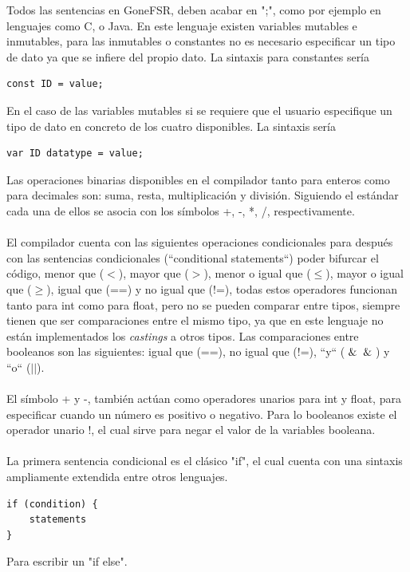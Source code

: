 Todos las sentencias en GoneFSR, deben acabar en ";", como por ejemplo en lenguajes como C, o Java. En este lenguaje existen variables mutables e inmutables, para las inmutables o constantes no es necesario especificar un tipo de dato ya que se infiere del propio dato. La sintaxis para constantes sería
\begin{lstlisting}[style=goneStyle]
const ID = value;
\end{lstlisting}
En el caso de las variables mutables si se requiere que el usuario especifique un tipo de dato en concreto de los cuatro disponibles. La sintaxis sería
\begin{lstlisting}[style=goneStyle]
var ID datatype = value;
\end{lstlisting}
Las operaciones binarias disponibles en el compilador tanto para enteros como para decimales son: suma, resta, multiplicación y división. Siguiendo el estándar cada una de ellos se asocia con los símbolos +, -, *, /, respectivamente.\\\\
El compilador cuenta con las siguientes operaciones condicionales para después con las sentencias condicionales (``conditional statements``) poder  bifurcar el código, menor que ($<$), mayor que ($>$), menor o igual que ($\leq$), mayor o igual que ($\geq$), igual que (==) y no igual que (!=), todas estos operadores funcionan tanto para int como para float, pero no se pueden comparar entre tipos, siempre tienen que ser comparaciones entre el mismo tipo, ya que en este lenguaje no están implementados los \textit{castings} a otros tipos. Las comparaciones entre booleanos son las siguientes: igual que (==), no igual que (!=), ``y`` ($\And\And$) y ``o`` ($||$).\\\\
El símbolo + y -, también actúan como operadores unarios para int y float, para especificar cuando un número es positivo o negativo. Para lo booleanos existe el operador unario !, el cual sirve para negar el valor de la variables booleana. \\\\
\newpage
\noindent La primera sentencia condicional es el clásico "if", el cual cuenta con una sintaxis ampliamente extendida entre otros lenguajes.

\begin{lstlisting}[style=goneStyle]
if (condition) {
    statements
}
\end{lstlisting}

\noindent Para escribir un "if else".

